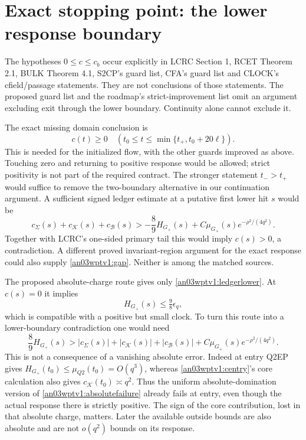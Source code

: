 \documentclass[11pt]{article}
\theoremstyle{remark}\newtheorem{remark}[theorem]{Remark}
\newcommand{\KK}{\mathcal K}
\newcommand{\BB}{\mathcal B}
\newcommand{\Gp}{G_+}
\begin{document}
\section{Exact stopping point: the lower response boundary}
The hypotheses $0\le c\le c_b$ occur explicitly in LCRC Section 1,
RCET Theorem 2.1, BULK Theorem 4.1, S2CP's guard list, CFA's guard
list and CLOCK's cfield/passage statements. They are not conclusions
of those statements. The proposed guard list and the roadmap's
strict-improvement list omit an argument excluding exit through
the lower boundary. Continuity alone cannot exclude it.

The exact missing domain conclusion is
\begin{equation}
 \boxed{\quad c(t)\ge0\quad
   (t_0\le t\le\min\{t_+,t_0+20\ell\}).\quad}
 \label{an03wptv1:gap}
\end{equation}
This is needed for the initialized flow, with the other guards
improved as above. Touching zero and returning to positive response
would be allowed; strict positivity is not part of the required
contract. The stronger statement $t_->t_+$ would suffice to remove
the two-boundary alternative in our continuation argument.
A sufficient signed ledger estimate at a putative first
lower hit $s$ would be
\begin{equation}
 c_{\Sigma}(s)+c_{\KK}(s)+c_{\BB}(s)
 >-\frac89 H_{\Gp}(s)
       +C\mu_{\Gp}(s)e^{-\rho^2/(4q^2)}.
 \label{an03wptv1:signedneeded}
\end{equation}
Together with LCRC's one-sided primary tail this would imply
$c(s)>0$, a contradiction. A different proved invariant-region
argument for the exact response could also supply
\eqref{an03wptv1:gap}. Neither is among the matched sources.

The proposed absolute-charge route gives only
\eqref{an03wptv1:ledgerlower}. At $c(s)=0$ it implies
\[
 H_{\Gp}(s)\le\tfrac98\epsilon_q,
\]
which is compatible with a positive but small clock. To turn this
route into a lower-boundary contradiction one would need
\begin{equation}
 \frac89H_{\Gp}(s)>
 |c_\Sigma(s)|+|c_{\KK}(s)|+|c_{\BB}(s)|
       +C\mu_{\Gp}(s)e^{-\rho^2/(4q^2)}.
 \label{an03wptv1:absolutefailure}
\end{equation}
This is not a consequence of a vanishing absolute error. Indeed
at entry Q2EP gives $H_{\Gp}(t_0)\le\mu_{Q2}(t_0)=O(q^3)$,
whereas \eqref{an03wptv1:centry}'s core calculation also gives
$c_{\KK}(t_0)\asymp q^2$. Thus the uniform absolute-domination
version of \eqref{an03wptv1:absolutefailure} already fails at entry,
even though the actual response there is strictly positive.
The sign of the core contribution, lost in that absolute charge,
matters. Later the available outside bounds are also absolute and
are not $o(q^2)$ bounds on its response.
\end{document}
